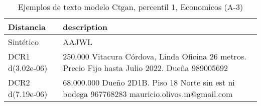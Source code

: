 \begin{table}[H]
\centering
\fontsize{10}{14}\selectfont
\caption{Ejemplos de texto modelo Ctgan, percentil 1, Economicos (A-3)}
\label{table-example-economicos-a-3-ctgan-1p-text}
\begin{tabular}{|l|m{35em}|}
\hline
\rowcolor[gray]{0.8}
Distancia & description \\
\hline Sintético & AAJWL \\
\hline DCR1 d(3.02e-06) & 250.000 Vitacura C\'ordova, Linda Oficina 26 metros. Precio Fijo hasta Julio 2022. Due\~na 989005692 \\
\hline DCR2 d(7.19e-06) & 68.000.000 Due\~no 2D1B. Piso 18 Norte sin est ni bodega 967768283 mauricio.olivos.m@gmail.com \\
\hline
\end{tabular}
\end{table}
